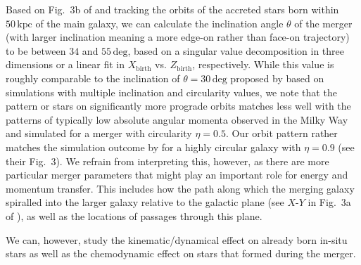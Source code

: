 \documentclass[fleqn,usenatbib]{mnras}
\begin{document}
Based on Fig.~3b of  and tracking the orbits of the accreted stars born within $50\,\mathrm{kpc}$ of the main galaxy, we can calculate the inclination angle $\theta$ of the merger (with larger inclination meaning a more edge-on rather than face-on trajectory) to be between $34$ and $55\,\mathrm{deg}$, based on a singular value decomposition in three dimensions or a linear fit in $X_\mathrm{birth}$ vs. $Z_\mathrm{birth}$, respectively. While this value is roughly comparable to the inclination of $\theta = 30\,\mathrm{deg}$ proposed by \citet{Naidu2021} based on simulations with multiple inclination and circularity values, we note that the pattern or stars on significantly more prograde orbits matches less well with the patterns of typically low absolute angular momenta observed in the Milky Way and simulated for a merger with circularity $\eta = 0.5$. Our orbit pattern rather matches the simulation outcome by \citet{Naidu2021} for a highly circular galaxy with $\eta = 0.9$ (see their Fig.~3). We refrain from interpreting this, however, as there are more particular merger parameters that might play an important role for energy and momentum transfer. This includes how the path along which the merging galaxy spiralled into the larger galaxy relative to the galactic plane (see $X$-$Y$ in Fig.~3a of ), as well as the locations of passages through this plane.

We can, however, study the kinematic/dynamical effect on already born in-situ stars as well as the chemodynamic effect on stars that formed during the merger.
\end{document}
